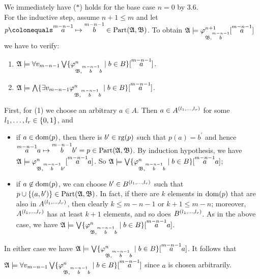 \begin{enumerate}[1.]
We immediately have ($\ast$) holds for the base case $n = 0$ by 3.6.\medskip\\
For the inductive step, assume $n + 1 \leq m$ and let $p \colonequals \vect{a}{m - n - 1} \mapsto \vect{b}{m - n - 1} \in \partism{\struct{A}}{\struct{B}}$. To obtain $\struct{A} \models \varphi^{n + 1}_{\struct{B}, \vect{b}{m - n - 1}}[\vect{a}{m - n - 1}]$ we have to verify:
\begin{enumerate}[(1)]
\item $\struct{A} \models \forall v_{m - n - 1} \bigvee \setm{\varphi^n_{\struct{B}, \vect{b}{m - n - 1}b}}{b \in B}[\vect{a}{m - n - 1}]$.
\item $\struct{A} \models \bigwedge \setm{\exists v_{m - n - 1} \varphi^n_{\struct{B}, \vect{b}{m - n - 1}b}}{b \in B}[\vect{a}{m - n - 1}]$.
\end{enumerate}
First, for (1) we choose an arbitrary $a \in A$. Then $a \in A^{\tuple{\seq[1]{l}{r}}}$ for some $\seq[1]{l}{r} \in \{ 0, 1 \}$, and
\begin{itemize}
\item if $a \in \dom{p}$, then there is $b^\prime \in \rg{p}$ such that $p(a) = b^\prime$ and hence $\vect{a}{m - n - 1}a \mapsto \vect{b}{m - n - 1}b^\prime = p \in \partism{\struct{A}}{\struct{B}}$. By induction hypothesis, we have $\struct{A} \models \varphi^n_{\struct{B}, \vect{b}{m - n - 1}b^\prime}[\vect{a}{m - n - 1}a]$. So $\struct{A} \models \bigvee \setm{\varphi^n_{\struct{B}, \vect{b}{m - n - 1}b}}{b \in B}[\vect{a}{m - n - 1}a]$;
\item if $a \not\in \dom{p}$, we can choose $b^\prime \in B^{\tuple{\seq[1]{l}{r}}}$ such that $p \cup \{ (a, b^\prime) \} \in \partism{\struct{A}}{\struct{B}}$. In fact, if there are $k$ elements in $\dom{p}$ that are also in $A^{\tuple{\seq[1]{l}{r}}}$, then clearly $k \leq m - n - 1$ or $k + 1 \leq m - n$; moreover, $A^{\tuple{\seq[1]{l}{r}}}$ has at least $k + 1$ elements, and so does $B^{\tuple{\seq[1]{l}{r}}}$. As in the above case, we have 
$\struct{A} \models \bigvee \setm{\varphi^n_{\struct{B}, \vect{b}{m - n - 1}b}}{b \in B}[\vect{a}{m - n - 1}a]$.
\end{itemize}
In either case we have $\struct{A} \models \bigvee \setm{\varphi^n_{\struct{B}, \vect{b}{m - n - 1}b}}{b \in B}[\vect{a}{m - n - 1}a]$. It follows that $\struct{A} \models \forall v_{m - n - 1} \bigvee \setm{\varphi^n_{\struct{B}, \vect{b}{m - n - 1}b}}{b \in B}[\vect{a}{m - n - 1}]$ since $a$ is chosen arbitrarily.\\
\ \\

\end{enumerate}
